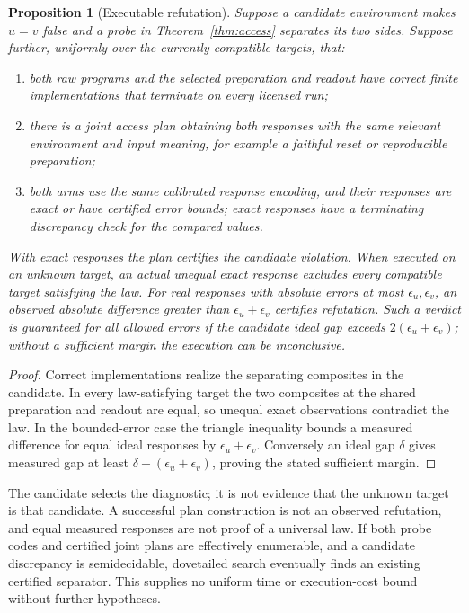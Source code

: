 \documentclass[11pt]{article}
\newtheorem{proposition}[theorem]{Proposition}
\theoremstyle{definition}
\theoremstyle{remark}\newtheorem{remark}[theorem]{Remark}
\begin{document}
\begin{proposition}[Executable refutation]\label{prop:execution}
Suppose a candidate environment makes $u=v$ false and a probe in
Theorem~\ref{thm:access} separates its two sides. Suppose further, uniformly over the currently compatible targets, that:
\begin{enumerate}
\item both raw programs and the selected preparation and readout have
      correct finite implementations that terminate on every licensed run;
\item there is a joint access plan obtaining both responses with the same
      relevant environment and input meaning, for example a faithful reset
      or reproducible preparation;
\item both arms use the same calibrated response encoding, and their
      responses are exact or have certified error bounds; exact responses
      have a terminating discrepancy check for the compared values.
\end{enumerate}
With exact responses the plan certifies the candidate violation. When
executed on an unknown target, an actual unequal exact response excludes
every compatible target satisfying the law. For real responses with
absolute errors at most $\epsilon_u,\epsilon_v$, an observed absolute
difference greater than $\epsilon_u+\epsilon_v$ certifies refutation.
Such a verdict is guaranteed for all allowed errors if the candidate ideal
gap exceeds $2(\epsilon_u+\epsilon_v)$; without a sufficient margin the
execution can be inconclusive.
\end{proposition}
\begin{proof}
Correct implementations realize the separating composites in the candidate.
In every law-satisfying target the two composites at the shared preparation
and readout are equal, so unequal exact observations contradict the law.
In the bounded-error case the triangle inequality bounds a measured
difference for equal ideal responses by $\epsilon_u+\epsilon_v$. Conversely
an ideal gap $\delta$ gives measured gap at least
$\delta-(\epsilon_u+\epsilon_v)$, proving the stated sufficient margin.
\end{proof}
The candidate selects the diagnostic; it is not evidence that the unknown
target is that candidate. A successful plan construction is not an observed
refutation, and equal measured responses are not proof of a universal law.
If both probe codes and certified joint plans are effectively enumerable,
and a candidate discrepancy is semidecidable, dovetailed search eventually
finds an existing certified separator. This supplies no uniform time or
execution-cost bound without further hypotheses.
\end{document}
